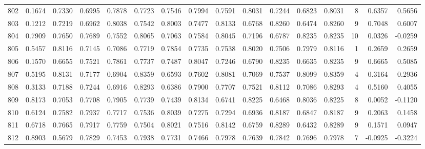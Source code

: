 \begin{tabular}{lrrrrrrrrrrrrrrr}
802 &      0.1674 &  0.7330 &  0.6995 &  0.7878 &  0.7723 &  0.7546 &  0.7994 &  0.7591 &  0.8031 &  0.7244 &   0.6823 &     0.8031 &      8 &                    0.6357 &                     0.5656 \\
803 &      0.1212 &  0.7219 &  0.6962 &  0.8038 &  0.7542 &  0.8003 &  0.7477 &  0.8133 &  0.6768 &  0.8260 &   0.6474 &     0.8260 &      9 &                    0.7048 &                     0.6007 \\
804 &      0.7909 &  0.7650 &  0.7689 &  0.7552 &  0.8065 &  0.7063 &  0.7584 &  0.8045 &  0.7196 &  0.6787 &   0.8235 &     0.8235 &     10 &                    0.0326 &                    -0.0259 \\
805 &      0.5457 &  0.8116 &  0.7145 &  0.7086 &  0.7719 &  0.7854 &  0.7735 &  0.7538 &  0.8020 &  0.7506 &   0.7979 &     0.8116 &      1 &                    0.2659 &                     0.2659 \\
806 &      0.1570 &  0.6655 &  0.7521 &  0.7861 &  0.7737 &  0.7487 &  0.8047 &  0.7246 &  0.6790 &  0.8235 &   0.6635 &     0.8235 &      9 &                    0.6665 &                     0.5085 \\
807 &      0.5195 &  0.8131 &  0.7177 &  0.6904 &  0.8359 &  0.6593 &  0.7602 &  0.8081 &  0.7069 &  0.7537 &   0.8099 &     0.8359 &      4 &                    0.3164 &                     0.2936 \\
808 &      0.3133 &  0.7188 &  0.7244 &  0.6916 &  0.8293 &  0.6386 &  0.7900 &  0.7707 &  0.7521 &  0.8112 &   0.7086 &     0.8293 &      4 &                    0.5160 &                     0.4055 \\
809 &      0.8173 &  0.7053 &  0.7708 &  0.7905 &  0.7739 &  0.7439 &  0.8134 &  0.6741 &  0.8225 &  0.6468 &   0.8036 &     0.8225 &      8 &                    0.0052 &                    -0.1120 \\
810 &      0.6124 &  0.7582 &  0.7937 &  0.7717 &  0.7536 &  0.8039 &  0.7275 &  0.7294 &  0.6936 &  0.8187 &   0.6847 &     0.8187 &      9 &                    0.2063 &                     0.1458 \\
811 &      0.6718 &  0.7665 &  0.7917 &  0.7759 &  0.7504 &  0.8021 &  0.7516 &  0.8142 &  0.6759 &  0.8289 &   0.6432 &     0.8289 &      9 &                    0.1571 &                     0.0947 \\
812 &      0.8903 &  0.5679 &  0.7829 &  0.7453 &  0.7938 &  0.7731 &  0.7466 &  0.7978 &  0.7639 &  0.7842 &   0.7696 &     0.7978 &      7 &                   -0.0925 &                    -0.3224 \\

\end{tabular}
